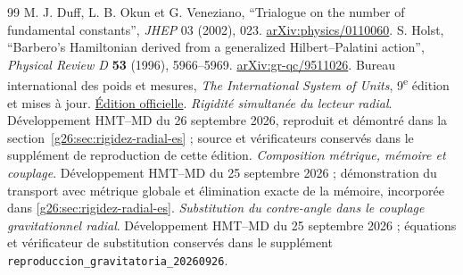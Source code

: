 \begin{thebibliography}{99}
 M. J. Duff, L. B. Okun et G. Veneziano, ``Trialogue on the number of fundamental constants'', \emph{JHEP} 03 (2002), 023. \href{https://arxiv.org/abs/physics/0110060}{arXiv:physics/0110060}.
 S. Holst, ``Barbero's Hamiltonian derived from a generalized Hilbert--Palatini action'', \emph{Physical Review D} \textbf{53} (1996), 5966--5969. \href{https://arxiv.org/abs/gr-qc/9511026}{arXiv:gr-qc/9511026}.
 Bureau international des poids et mesures, \emph{The International System of Units}, 9\textsuperscript{e} édition et mises à jour. \href{https://www.bipm.org/en/publications/si-brochure}{Édition officielle}.
 \emph{Rigidité simultanée du lecteur radial}.
Développement HMT--MD du 26 septembre 2026, reproduit et démontré
dans la section~\ref{g26:sec:rigidez-radial-es} ; source et vérificateurs
conservés dans le supplément de reproduction de cette édition.
 \emph{Composition métrique, mémoire et couplage}.
Développement HMT--MD du 25 septembre 2026 ; démonstration du transport
avec métrique globale et élimination exacte de la mémoire, incorporée dans
\ref{g26:sec:rigidez-radial-es}.
 \emph{Substitution du contre-angle dans le couplage
gravitationnel radial}. Développement HMT--MD du 25 septembre 2026 ;
équations et vérificateur de substitution conservés dans le supplément
\texttt{reproduccion\_gravitatoria\_20260926}.
\end{thebibliography}
